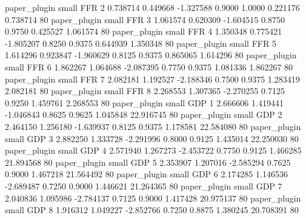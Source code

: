   paper_plugin      small      FFR                 2 0.738714 0.449668 -1.327588 0.9000 1.0000  0.221176    0.738714 80
  paper_plugin      small      FFR                 3 1.061574 0.620309 -1.604515 0.8750 0.9750  0.425527    1.061574 80
  paper_plugin      small      FFR                 4 1.350348 0.775421 -1.805207 0.8250 0.9375  0.644939    1.350348 80
  paper_plugin      small      FFR                 5 1.614296 0.923847 -1.960629 0.8125 0.9375  0.865065    1.614296 80
  paper_plugin      small      FFR                 6 1.862267 1.064688 -2.087395 0.7750 0.9375  1.081336    1.862267 80
  paper_plugin      small      FFR                 7 2.082181 1.192527 -2.188346 0.7500 0.9375  1.283419    2.082181 80
  paper_plugin      small      FFR                 8 2.268553 1.307365 -2.270255 0.7125 0.9250  1.459761    2.268553 80
  paper_plugin      small      GDP                 1 2.666606 1.419441 -1.046843 0.8625 0.9625  1.045848   22.916745 80
  paper_plugin      small      GDP                 2 2.464150 1.256180 -1.639937 0.8125 0.9375  1.178581   22.584080 80
  paper_plugin      small      GDP                 3 2.882250 1.333728 -2.291996 0.8000 0.9125  1.435014   22.250030 80
  paper_plugin      small      GDP                 4 2.571940 1.267273 -2.453722 0.7750 0.9125  1.466285   21.894568 80
  paper_plugin      small      GDP                 5 2.353907 1.207016 -2.585294 0.7625 0.9000  1.467218   21.564492 80
  paper_plugin      small      GDP                 6 2.174285 1.146536 -2.689487 0.7250 0.9000  1.446621   21.264365 80
  paper_plugin      small      GDP                 7 2.040836 1.095986 -2.784137 0.7125 0.9000  1.417428   20.975137 80
  paper_plugin      small      GDP                 8 1.916312 1.049227 -2.852766 0.7250 0.8875  1.380245   20.708391 80
